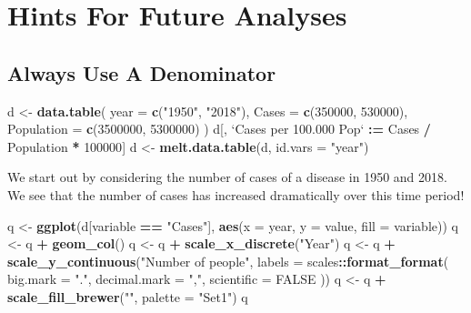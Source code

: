 \documentclass[]{book}
\newenvironment{Shaded}{\begin{snugshade}}{\end{snugshade}}
\newcommand{\KeywordTok}[1]{\textcolor[rgb]{0.13,0.29,0.53}{\textbf{#1}}}
\newcommand{\DataTypeTok}[1]{\textcolor[rgb]{0.13,0.29,0.53}{#1}}
\newcommand{\DecValTok}[1]{\textcolor[rgb]{0.00,0.00,0.81}{#1}}
\newcommand{\StringTok}[1]{\textcolor[rgb]{0.31,0.60,0.02}{#1}}
\newcommand{\OtherTok}[1]{\textcolor[rgb]{0.56,0.35,0.01}{#1}}
\newcommand{\OperatorTok}[1]{\textcolor[rgb]{0.81,0.36,0.00}{\textbf{#1}}}
\newcommand{\ErrorTok}[1]{\textcolor[rgb]{0.64,0.00,0.00}{\textbf{#1}}}
\newcommand{\NormalTok}[1]{#1}
\begin{document}
\section{Hints For Future Analyses}\label{hints-for-future-analyses}

\subsection{Always Use A Denominator}\label{always-use-a-denominator}

\begin{Shaded}
\begin{Highlighting}[]
\NormalTok{d <-}\StringTok{ }\KeywordTok{data.table}\NormalTok{(}
  \DataTypeTok{year =} \KeywordTok{c}\NormalTok{(}\StringTok{"1950"}\NormalTok{, }\StringTok{"2018"}\NormalTok{),}
  \DataTypeTok{Cases =} \KeywordTok{c}\NormalTok{(}\DecValTok{350000}\NormalTok{, }\DecValTok{530000}\NormalTok{),}
  \DataTypeTok{Population =} \KeywordTok{c}\NormalTok{(}\DecValTok{3500000}\NormalTok{, }\DecValTok{5300000}\NormalTok{)}
\NormalTok{)}
\NormalTok{d[, }\StringTok{`}\DataTypeTok{Cases per 100.000 Pop}\StringTok{`} \OperatorTok{:}\ErrorTok{=}\StringTok{ }\NormalTok{Cases }\OperatorTok{/}\StringTok{ }\NormalTok{Population }\OperatorTok{*}\StringTok{ }\DecValTok{100000}\NormalTok{]}
\NormalTok{d <-}\StringTok{ }\KeywordTok{melt.data.table}\NormalTok{(d, }\DataTypeTok{id.vars =} \StringTok{"year"}\NormalTok{)}
\end{Highlighting}
\end{Shaded}

We start out by considering the number of cases of a disease in 1950 and
2018. We see that the number of cases has increased dramatically over
this time period!

\begin{Shaded}
\begin{Highlighting}[]
\NormalTok{q <-}\StringTok{ }\KeywordTok{ggplot}\NormalTok{(d[variable }\OperatorTok{==}\StringTok{ "Cases"}\NormalTok{], }\KeywordTok{aes}\NormalTok{(}\DataTypeTok{x =}\NormalTok{ year, }\DataTypeTok{y =}\NormalTok{ value, }\DataTypeTok{fill =}\NormalTok{ variable))}
\NormalTok{q <-}\StringTok{ }\NormalTok{q }\OperatorTok{+}\StringTok{ }\KeywordTok{geom_col}\NormalTok{()}
\NormalTok{q <-}\StringTok{ }\NormalTok{q }\OperatorTok{+}\StringTok{ }\KeywordTok{scale_x_discrete}\NormalTok{(}\StringTok{"Year"}\NormalTok{)}
\NormalTok{q <-}\StringTok{ }\NormalTok{q }\OperatorTok{+}\StringTok{ }\KeywordTok{scale_y_continuous}\NormalTok{(}\StringTok{"Number of people"}\NormalTok{, }\DataTypeTok{labels =}\NormalTok{ scales}\OperatorTok{::}\KeywordTok{format_format}\NormalTok{(}
  \DataTypeTok{big.mark =} \StringTok{"."}\NormalTok{,}
  \DataTypeTok{decimal.mark =} \StringTok{","}\NormalTok{, }
  \DataTypeTok{scientific =} \OtherTok{FALSE}
\NormalTok{  ))}
\NormalTok{q <-}\StringTok{ }\NormalTok{q }\OperatorTok{+}\StringTok{ }\KeywordTok{scale_fill_brewer}\NormalTok{(}\StringTok{""}\NormalTok{, }\DataTypeTok{palette =} \StringTok{"Set1"}\NormalTok{)}
\NormalTok{q}
\end{Highlighting}
\end{Shaded}
\end{document}
